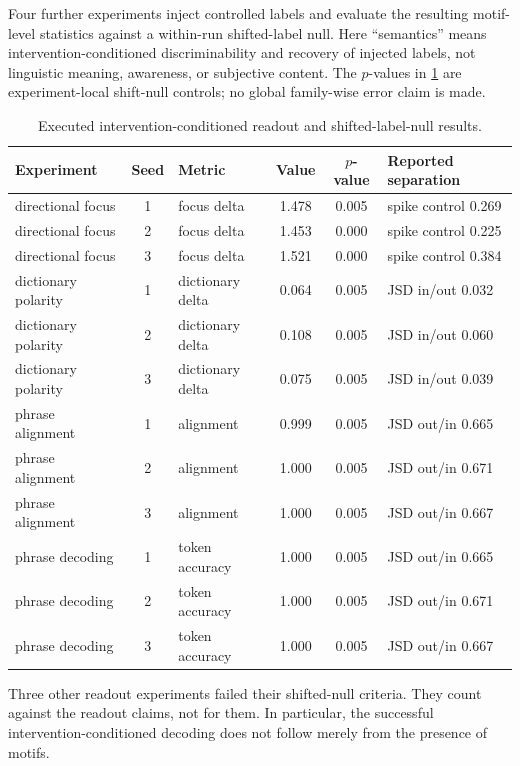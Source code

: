 Four further experiments inject controlled labels and evaluate the resulting
motif-level statistics against a within-run shifted-label null.  Here
``semantics'' means intervention-conditioned discriminability and recovery
of injected labels, not linguistic meaning, awareness, or subjective
content.  The $p$-values in \cref{tab:life-intervention} are experiment-local
shift-null controls; no global family-wise error claim is made.

\begin{table}[htbp]
\centering
\scriptsize
\begin{tabular}{@{}lclccl@{}}
\toprule
Experiment & Seed & Metric & Value & $p$-value & Reported separation \\
\midrule
directional focus & 1 & focus delta & 1.478 & 0.005 & spike control 0.269 \\
directional focus & 2 & focus delta & 1.453 & 0.000 & spike control 0.225 \\
directional focus & 3 & focus delta & 1.521 & 0.000 & spike control 0.384 \\
\addlinespace
dictionary polarity & 1 & dictionary delta & 0.064 & 0.005 & JSD in/out 0.032 \\
dictionary polarity & 2 & dictionary delta & 0.108 & 0.005 & JSD in/out 0.060 \\
dictionary polarity & 3 & dictionary delta & 0.075 & 0.005 & JSD in/out 0.039 \\
\addlinespace
phrase alignment & 1 & alignment & 0.999 & 0.005 & JSD out/in 0.665 \\
phrase alignment & 2 & alignment & 1.000 & 0.005 & JSD out/in 0.671 \\
phrase alignment & 3 & alignment & 1.000 & 0.005 & JSD out/in 0.667 \\
\addlinespace
phrase decoding & 1 & token accuracy & 1.000 & 0.005 & JSD out/in 0.665 \\
phrase decoding & 2 & token accuracy & 1.000 & 0.005 & JSD out/in 0.671 \\
phrase decoding & 3 & token accuracy & 1.000 & 0.005 & JSD out/in 0.667 \\
\bottomrule
\end{tabular}
\caption{Executed intervention-conditioned readout and shifted-label-null
results.}
\label{tab:life-intervention}
\end{table}

Three other readout experiments failed their shifted-null criteria.  They count
against the readout claims, not for them.  In particular, the successful
intervention-conditioned decoding does not follow merely from the presence
of motifs.

